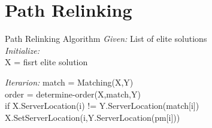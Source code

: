 \section{Path Relinking}
\begin{frame}{Path Relinking Algorithm}{}
  \textit{Given:}
  List of elite solutions \\
  \textit{Initialize:} \\
  X = fisrt elite solution \hfill
  
  \textit{Iterarion:}
  match = Matching(X,Y)\\
  order = determine-order(X,match,Y)\\
  if X.ServerLocation(i) != Y.ServerLocation(match[i])
  X.SetServerLocation(i,Y.ServerLocation(pm[i]))
\end{frame}

